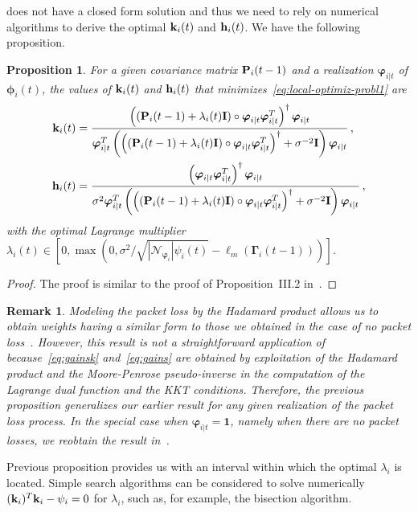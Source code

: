 \documentclass[a4paper,notitlepage,onecolumn]{article}
\def\1{\mathbf{1}}
\def\P{\mathds{P}}
\def\I{{\cal I}}
\def\k{{\bf k}}
\def\h{{\bf h}}
\def\I{{\bf I}}
\def\P{{\bf P}}
\def\phib{\boldsymbol{\phi}}
\def\varphib{\boldsymbol{\varphi}}
\def\Gammab{\boldsymbol{\Gamma}}
\newtheorem{proposition}[theorem]{Proposition}
\newtheorem{remark}[theorem]{Remark}
\numberwithin{equation}{section}
\begin{document}
does not have a closed form solution and thus we need to rely on
numerical algorithms to derive the optimal $\k_i(t)$ and
$\h_i(t)$. We have the following proposition.
\begin{proposition}
    \label{prop:optimal-values}
    For a given covariance matrix $\P_i(t-1)$ and a realization $\varphib_{i|t}$ of $\phib_i(t)$, the values of $\k_i(t)$ and $\h_i(t)$ that
    minimizes~\eqref{eq:local-optimiz-probl1} are
    \begin{align}
        \k_i(t) &= \frac{ \left((\P_i(t-1)+\lambda_i(t) \I) \circ \varphib_{i|t}\varphib_{i|t}^T\right)^\dag\varphib_{i|t}}
        {\varphib_{i|t}^T\left(\left((\P_i(t-1)+\lambda_i(t) \I) \circ \varphib_{i|t}\varphib_{i|t}^T\right)^\dag + \sigma^{-2}\I \right) \varphib_{i|t}} \,, \label{eq:gainsk} \\
        \h_i(t) &= \frac{\left(\varphib_{i|t} \varphib_{i|t}^T\right)^\dag\varphib_{i|t}}
        {\sigma^2\varphib_{i|t}^T  \left(\left((\P_i(t-1)+\lambda_i(t) \I) \circ \varphib_{i|t}\varphib_{i|t}^T\right)^\dag + \sigma^{-2}\I\right)\varphib_{i|t}} \,,
        \label{eq:gains}
    \end{align}
    with the optimal Lagrange multiplier $\lambda_i(t)\in  \left[0, \max\left(0,\sigma^2/\sqrt{|\mathcal{N}_{\varphib_i}|
    \psi_i(t)} - \ell_m (\Gammab_i(t-1))\right)\right]$.
\end{proposition}
\begin{proof}
The proof is similar to the proof of Proposition~III.2
in~\cite{JSAC07}.
\end{proof}
\begin{remark}
Modeling the packet loss by the Hadamard product allows us to
obtain weights having a similar form to those we obtained in the
case of no packet loss~\cite{JSAC07}. However, this result is not
a straightforward application of~\cite{JSAC07}
because~\eqref{eq:gainsk} and~\eqref{eq:gains} are obtained by
exploitation of the Hadamard product and the Moore-Penrose
pseudo-inverse in the computation of the Lagrange dual function
and the KKT conditions. Therefore, the previous proposition
generalizes our earlier result for any given realization of the
packet loss process. In the special case when $\varphib_{i|t} =
\1$, namely when there are no packet losses, we reobtain the
result in~\cite{JSAC07}.
\end{remark}

Previous proposition provides us with an interval within which the
optimal $\lambda_i$ is located. Simple search algorithms can be
considered to solve numerically $(\k_i)^T \k_i-\psi_i=0$ for
$\lambda_i$, such as, for example, the bisection algorithm.
\end{document}
